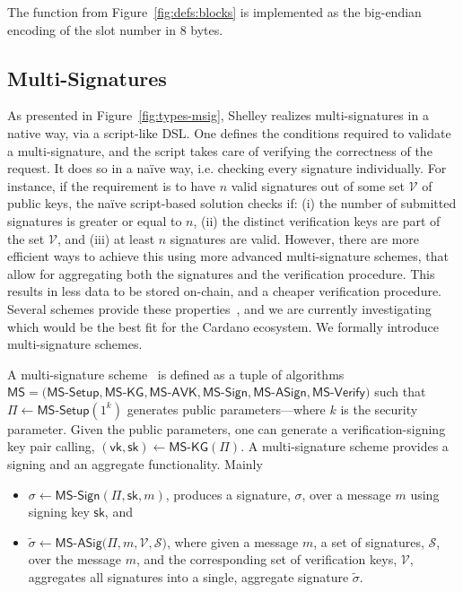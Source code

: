 The function  from Figure~\ref{fig:defs:blocks} is implemented
as the big-endian encoding of the slot number in 8 bytes.

\subsection{Multi-Signatures}
As presented in Figure~\ref{fig:types-msig}, Shelley realizes multi-signatures 
in a native way, via a script-like DSL. One defines the conditions required to 
validate a multi-signature, and the script takes care of verifying the 
correctness of the request. It does so in a na\"ive way, i.e. checking every 
signature individually. For instance, if the requirement is to have $n$ valid 
signatures out of some set $\mathcal{V}$ of public keys, the na\"ive 
script-based solution checks if: (i) the number of submitted signatures is 
greater or equal to $n$, (ii) the distinct verification keys are part of the set 
$\mathcal{V}$, and (iii) at least $n$ signatures are valid. However, there are 
more efficient ways to achieve this using more advanced multi-signature schemes, 
that allow for aggregating both the signatures and the verification procedure. 
This results in less data to be stored on-chain, and a cheaper verification 
procedure. Several schemes provide these properties~\cite{musigBoneh, musig, 
musig2, pixel}, and we are currently investigating which would be the best fit 
for the Cardano ecosystem. We formally introduce multi-signature schemes.

\sloppy
A multi-signature scheme~\cite{musigs} is defined as a tuple of algorithms 
$\textsf{MS} = (\textsf{MS-Setup}, \textsf{MS-KG}, \textsf{MS-AVK}, 
\allowbreak\textsf{MS-Sign}, \textsf{MS-ASign}, \textsf{MS-Verify)}$ such that 
$\Pi\leftarrow\textsf{MS-Setup}(1^k)$ generates public parameters---where $k$ is 
the security parameter. Given the public parameters, one can generate a 
verification-signing key pair calling, 
$(\mathsf{vk,sk})\leftarrow\textsf{MS-KG}(\Pi)$. A multi-signature scheme 
provides a signing and an aggregate functionality. Mainly
\begin{itemize}
\item $\sigma\leftarrow\textsf{MS-Sign}(\Pi, \mathsf{sk}, m)$, produces a 
signature, $\sigma$, over a message $m$ using signing key $\mathsf{sk}$, and
\item $\tilde{\sigma}\leftarrow\textsf{MS-ASig}(\Pi, m, \mathcal{V, S)}$, where 
given a message $m$, a set of signatures, $\mathcal{S}$, over the message $m$, 
and the corresponding set of verification keys, $\mathcal{V}$, aggregates all 
signatures into a single, aggregate signature $\tilde{\sigma}$. 
\end{itemize}

